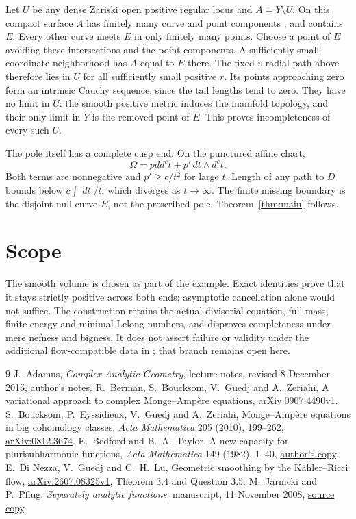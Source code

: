 \documentclass[11pt]{article}
\newcommand{\ddc}{dd^c}
\newcommand{\dc}{d^c}
\begin{document}
Let $U$ be any dense Zariski open positive regular locus and
$A=Y\setminus U$. On this compact surface $A$ has finitely many curve
and point components \cite[Theorem 7.8 and Corollary 7.10]{Adamus}, and contains $E$. Every other curve meets $E$
in only finitely many points. Choose a point of $E$ avoiding these
intersections and the point components. A sufficiently small coordinate
neighborhood has $A$ equal to $E$ there. The fixed-$v$ radial path
above therefore lies in $U$ for all sufficiently small positive $r$.
Its points approaching zero form an intrinsic Cauchy sequence, since
the tail lengths tend to zero. They have no limit in $U$: the smooth
positive metric induces the manifold topology, and their only limit
in $Y$ is the removed point of $E$. This proves incompleteness of every
such $U$.

The pole itself has a complete cusp end. On the punctured affine chart,
\[
 \Omega=p\ddc t+p'\,dt\wedge\dc t.
\]
Both terms are nonnegative and $p'\geq c/t^2$ for large $t$.
Length of any path to $D$ bounds below $c\int|dt|/t$, which diverges
as $t\to\infty$. The finite missing boundary is the disjoint null curve
$E$, not the prescribed pole. Theorem~\ref{thm:main} follows.

\section{Scope}
The smooth volume is chosen as part of the example. Exact identities
prove that it stays strictly positive across both ends; asymptotic
cancellation alone would not suffice. The construction retains the
actual divisorial equation, full mass, finite energy and minimal Lelong
numbers, and disproves completeness under mere nefness and bigness.
It does not assert failure or validity under the additional flow-compatible
data in \cite[Section 3.1]{DGL}; that branch remains open here.

\begin{thebibliography}{9}
 J.~Adamus, \emph{Complex Analytic Geometry},
lecture notes, revised 8 December 2015,
\href{https://www.math.uwo.ca/faculty/adamus/teaching/9607b2019/CAGI.pdf}{author's notes}.
 R.~Berman, S.~Boucksom, V.~Guedj and A.~Zeriahi,
A variational approach to complex Monge--Amp\`ere equations,
\href{https://arxiv.org/abs/0907.4490}{arXiv:0907.4490v1}.
 S.~Boucksom, P.~Eyssidieux, V.~Guedj and A.~Zeriahi,
Monge--Amp\`ere equations in big cohomology classes,
\emph{Acta Mathematica} 205 (2010), 199--262,
\href{https://arxiv.org/abs/0812.3674}{arXiv:0812.3674}.
 E.~Bedford and B.~A.~Taylor,
A new capacity for plurisubharmonic functions,
\emph{Acta Mathematica} 149 (1982), 1--40,
\href{https://www.math.stonybrook.edu/~ebedford/PapersForM655/BTNewCapacity.pdf}{author's copy}.
 E.~Di Nezza, V.~Guedj and C.~H.~Lu,
Geometric smoothing by the K\"ahler--Ricci flow,
\href{https://arxiv.org/abs/2607.08325}{arXiv:2607.08325v1},
Theorem 3.4 and Question 3.5.
 M.~Jarnicki and P.~Pflug, \emph{Separately analytic functions},
manuscript, 11 November 2008,
\href{https://www.math.stonybrook.edu/~ebedford/PapersForM537/JarnickiPflugSepHolo081111.pdf}{source copy}.
\end{thebibliography}
\end{document}

